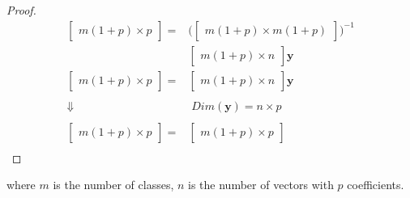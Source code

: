 \begin{proof}
\begin{equation*}
\begin{split}
\begin{bmatrix}
		m (1+p) \times p
	\end{bmatrix}
	= &
	\biggl(\begin{bmatrix}
		m(1+p) \times  m(1+p)
	\end{bmatrix} \biggr)^{-1} \\ &
	\begin{bmatrix}
		m(1+p) \times n 
	\end{bmatrix} \mathbf{y} \\ %
	\begin{bmatrix}
		m (1+p) \times p
	\end{bmatrix}
	= &
	\begin{bmatrix}
		m(1+p) \times n 
	\end{bmatrix} \mathbf{y} \\ %
	& \\
	\Downarrow & \; Dim(\mathbf{y}) = n \times p \\ %
	& \\
	\begin{bmatrix}
		m (1+p) \times p
	\end{bmatrix}
	= &
	\begin{bmatrix}
		m(1+p) \times p 
	\end{bmatrix} \\ %
	\end{split}
\end{equation*}
\end{proof}
where $m$ is the number of classes, $n$ is the number of vectors with $p$ coefficients.
